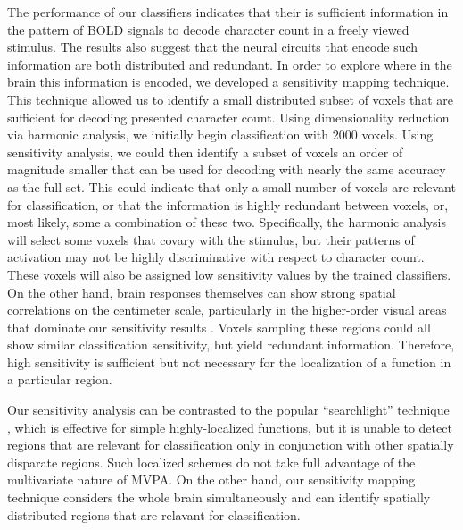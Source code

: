 \documentclass[preprint,5p,authoryear]{elsarticle}
\begin{document}
The performance of our classifiers indicates that their is sufficient information in the pattern of BOLD signals to decode character count in a freely viewed stimulus. 
The results also suggest that the neural circuits that encode such information are both distributed and redundant.
In order to explore where in the brain this information is encoded, we developed a sensitivity mapping technique.
This technique allowed us to identify a small distributed subset of voxels that are sufficient for decoding presented character count.
Using dimensionality reduction via harmonic analysis, we initially begin classification with 2000 voxels.
Using sensitivity analysis, we could then identify a subset of voxels an order of magnitude smaller that can be used for decoding with nearly the same accuracy as the full set.
This could indicate that only a small number of voxels are relevant for classification, or that the information is highly redundant between voxels, or, most likely, some a combination of these two.
Specifically, the harmonic analysis will select some voxels that covary with the stimulus, but their patterns of activation may not be highly discriminative with respect to character count.
These voxels will also be assigned low sensitivity values by the trained classifiers.
On the other hand, brain responses themselves can show strong spatial correlations on the centimeter scale, particularly in the higher-order visual areas that dominate our sensitivity results \citep{Engel1997}. 
Voxels sampling these regions could all show similar classification sensitivity, but yield redundant information.
Therefore, high sensitivity is sufficient but not necessary for the localization of a function in a particular region.

Our sensitivity analysis can be contrasted to the popular ``searchlight'' technique \citep{Kriegeskorte2006}, which is effective for simple highly-localized functions, but it is unable to detect regions that are relevant for classification only in conjunction with other spatially disparate regions.
Such localized schemes do not take full advantage of the multivariate nature of MVPA.
On the other hand, our sensitivity mapping technique considers the whole brain simultaneously and can identify spatially distributed regions that are relavant for classification.
\end{document}
